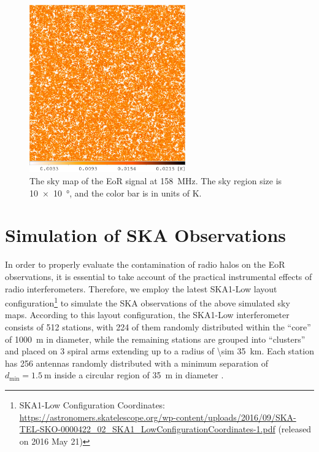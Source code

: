 \documentclass[modern]{aastex62}
\newcommand{\R}[1]{\mathrm{#1}}
\begin{document}
\begin{figure}
  \centering
  \includegraphics[width=0.6\textwidth]{21cm-f158-heat2}
  \caption{\label{fig:map-eor}%
    The sky map of the EoR signal at \SI{158}{\MHz}.
    The sky region size is \SI[product-units=repeat]{10 x 10}{\degree},
    and the color bar is in units of \si{\kelvin}.
  }
\end{figure}


\section{Simulation of SKA Observations}
\label{sec:obs-simu}

In order to properly evaluate the contamination of radio halos
on the EoR observations, it is essential to take account of the
practical instrumental effects of radio interferometers.
Therefore, we employ the latest SKA1-Low layout configuration\footnote{%
  SKA1-Low Configuration Coordinates:
  \url{https://astronomers.skatelescope.org/wp-content/uploads/2016/09/SKA-TEL-SKO-0000422_02_SKA1_LowConfigurationCoordinates-1.pdf}
  (released on 2016 May 21)
}
to simulate the SKA observations of the above simulated sky maps.
According to this layout configuration,
the SKA1-Low interferometer consists of 512 stations, with 224 of them
randomly distributed within the \enquote{core} of \SI{1000}{\meter} in
diameter, while the remaining stations are grouped into \enquote{clusters}
and placed on 3 spiral arms extending up to a radius of
\SI{\sim 35}{\kilo\meter}.
Each station has 256 antennas randomly distributed with a minimum separation
of $d_{\R{min}} = \SI{1.5}{\meter}$ inside a circular region of
\SI{35}{\meter} in diameter \citep[e.g.,][]{mort2017}.
\end{document}
